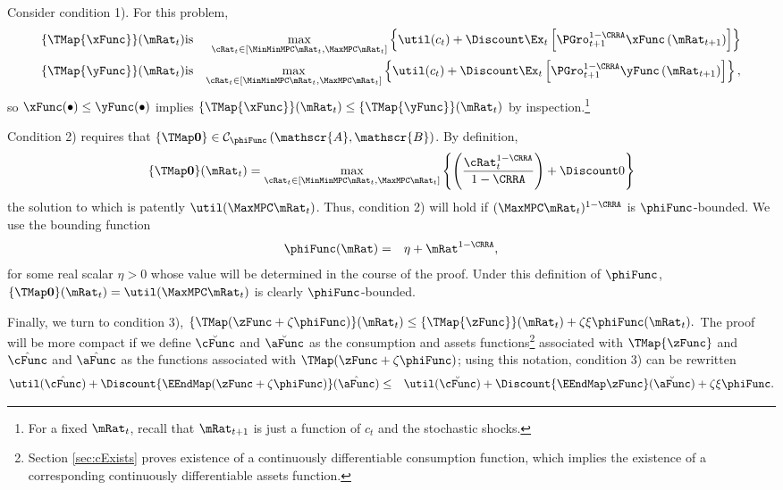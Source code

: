 \documentclass[titlepage]{\econtex}\providecommand{\texname}{BufferStockTheory}%
\begin{document}
Consider condition 1). For this problem,
\begin{eqnarray*}
\{\TMap{\mathfrak{\xFunc}}\}(\mRat_{t}) &\mbox{is}&\underset{\cRat_{t} \in
[\MinMinMPC \mRat_{t}, \MaxMPC \mRat_{t}]
}\max \left\{
\util(c_{t})+\Discount \Ex_{t}\left[ {\PGro}_{t+1}^{1-\CRRA }{\mathfrak{\xFunc}}
\left( {\mRat}_{t+1}\right) \right] \right\}  \notag  \label{eq:condition1}
\\
\{\TMap{\mathfrak{\yFunc}}\}(\mRat_{t}) &\mbox{is}&\underset{\cRat_{t} \in
[\MinMinMPC \mRat_{t}, \MaxMPC \mRat_{t}]
}\max \left\{
\util(c_{t})+\Discount \Ex_{t}\left[ {\PGro}_{t+1}^{1-\CRRA }{\mathfrak{\yFunc}}
\left( {\mRat}_{t+1}\right) \right] \right\} ,  \notag
\end{eqnarray*}%
so ${\mathfrak{\xFunc}}(\bullet) \leq {\mathfrak{\yFunc}}(\bullet)$ implies $\{\TMap{\mathfrak{\xFunc}}\}(\mRat_{t}) \leq \{\TMap{\mathfrak{\yFunc}} \}(\mRat_{t})$ by inspection.\footnote{For a fixed $\mRat_{t}$, recall that ${\mRat}_{t+1}$ is just a function of $c_{t}$ and the
stochastic shocks.}

Condition 2) requires that $\{\TMap\mathbf{0}\}\in \mathcal{C}_{\phiFunc}\left(\mathscr{A},\mathscr{B}\right)$. By definition,
\begin{equation*}
\{\TMap \mathbf{0}\}(\mRat_{t}) = \max_{\cRat_{t} \in
[\MinMinMPC \mRat_{t}, \MaxMPC \mRat_{t}]
}\left\{ \left( \frac{\cRat_{t}^{1-\CRRA }}{1-\CRRA }\right) +\Discount 0\right\}
\end{equation*}
the solution to which is patently
$\util(\MaxMPC \mRat_{t})$. Thus, condition 2)
will hold if $(\MaxMPC \mRat_{t})^{1-\CRRA}$ is $\phiFunc$-bounded.  We use
the bounding function
\begin{eqnarray}
  \label{eq:phiFunc}
  \phiFunc(\mRat) & = & \eta + \mRat^{1-\CRRA},
\end{eqnarray}
for some real scalar $\eta > 0$ whose value will be determined in the
course of the proof. Under this definition of $\phiFunc$,
$\{\TMap\mathbf{0}\}(\mRat_{t})= \util(\MaxMPC \mRat_{t})$
is clearly
$\phiFunc$-bounded.

Finally, we turn to condition 3), $\{\TMap({\zFunc} +\zeta\phiFunc
)\}(\mRat_{t}) \leq \{\TMap{\zFunc}\}(\mRat_{t}) +\zeta \xi
\phiFunc(\mRat_{t}).$ The proof will be more compact if we define
$\breve{\cFunc}$ and $\breve{\aFunc}$ as the consumption and assets
functions\footnote{Section \ref{sec:cExists} proves existence of a
  continuously differentiable consumption function, which implies the
  existence of a corresponding continuously differentiable assets
  function.}  associated with $\TMap{\zFunc}$ and $\hat{\cFunc}$ and
$\hat{\aFunc}$ as the functions associated with $\TMap({\zFunc+\zeta
  \phiFunc})$; using this notation, condition 3) can be rewritten
\begin{eqnarray*}
\util(\hat{\cFunc})+\Discount \{\EEndMap (\zFunc+\zeta \phiFunc) \}(\hat{\aFunc})  & \leq & \util(\breve{\cFunc})+\Discount \{\EEndMap \zFunc \}(\breve{\aFunc})  + \zeta \xi \phiFunc.
\end{eqnarray*}
\end{document}
